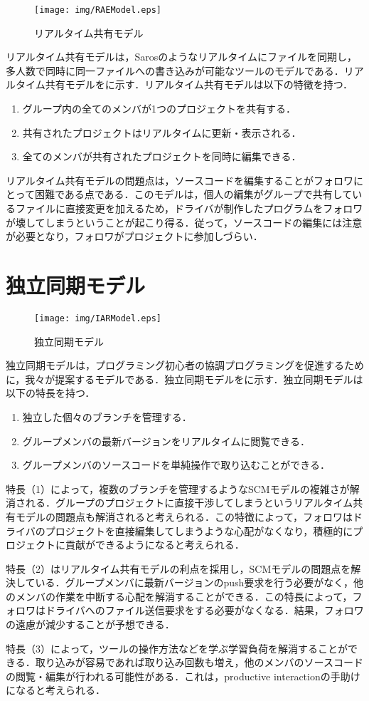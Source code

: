 \begin{figure}[h]
	\centering
	\texttt{[image: img/RAEModel.eps]}
	\caption{リアルタイム共有モデル}
	\label{fig:RAEModel}
\end{figure}

リアルタイム共有モデルは，Sarosのようなリアルタイムにファイルを同期し，多人数で同時に同一ファイルへの書き込みが可能なツールのモデルである．リアルタイム共有モデルをに示す．リアルタイム共有モデルは以下の特徴を持つ．

\begin{enumerate}
	\item グループ内の全てのメンバが1つのプロジェクトを共有する．
	\item 共有されたプロジェクトはリアルタイムに更新・表示される．
	\item 全てのメンバが共有されたプロジェクトを同時に編集できる．
\end{enumerate}

リアルタイム共有モデルの問題点は，ソースコードを編集することがフォロワにとって困難である点である．このモデルは，個人の編集がグループで共有しているファイルに直接変更を加えるため，ドライバが制作したプログラムをフォロワが壊してしまうということが起こり得る．従って，ソースコードの編集には注意が必要となり，フォロワがプロジェクトに参加しづらい．


\section{独立同期モデル}

\begin{figure}[h]
	\centering
	\texttt{[image: img/IARModel.eps]}
	\caption{独立同期モデル}
	\label{fig:IARModel}
\end{figure}

独立同期モデルは，プログラミング初心者の協調プログラミングを促進するために，我々が提案するモデルである．独立同期モデルをに示す．独立同期モデルは以下の特長を持つ．

\begin{enumerate}
	\item 独立した個々のブランチを管理する．
	\item グループメンバの最新バージョンをリアルタイムに閲覧できる．
	\item グループメンバのソースコードを単純操作で取り込むことができる．
\end{enumerate}

特長（1）によって，複数のブランチを管理するようなSCMモデルの複雑さが解消される．グループのプロジェクトに直接干渉してしまうというリアルタイム共有モデルの問題点も解消されると考えられる．この特徴によって，フォロワはドライバのプロジェクトを直接編集してしまうような心配がなくなり，積極的にプロジェクトに貢献ができるようになると考えられる．

特長（2）はリアルタイム共有モデルの利点を採用し，SCMモデルの問題点を解決している．グループメンバに最新バージョンのpush要求を行う必要がなく，他のメンバの作業を中断する心配を解消することができる．この特長によって，フォロワはドライバへのファイル送信要求をする必要がなくなる．結果，フォロワの遠慮が減少することが予想できる．

特長（3）によって，ツールの操作方法などを学ぶ学習負荷を解消することができる．取り込みが容易であれば取り込み回数も増え，他のメンバのソースコードの閲覧・編集が行われる可能性がある．これは，productive interactionの手助けになると考えられる．